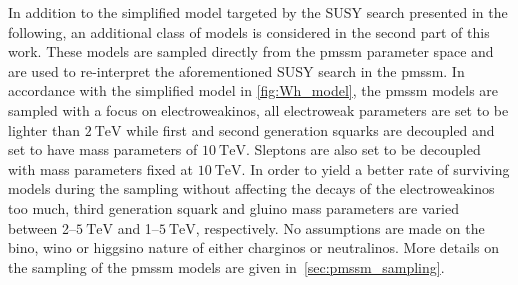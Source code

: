 In addition to the simplified model targeted by the SUSY search presented in the following, an additional class of models is considered in the second part of this work. These models are sampled directly from the \gls{pmssm} parameter space and are used to re-interpret the aforementioned SUSY search in the \gls{pmssm}. In accordance with the simplified model in \cref{fig:Wh_model}, the \gls{pmssm} models are sampled with a focus on electroweakinos, \ie all electroweak parameters are set to be lighter than $\SI{2}{\TeV}$ while first and second generation squarks are decoupled and set to have mass parameters of $\SI{10}{\TeV}$. Sleptons are also set to be decoupled with mass parameters fixed at $\SI{10}{\TeV}$.  In order to yield a better rate of surviving models during the sampling without affecting the decays of the electroweakinos too much, third generation squark and gluino mass parameters are varied between 2--$\SI{5}{\TeV}$ and 1--$\SI{5}{\TeV}$, respectively. No assumptions are made on the bino, wino or higgsino nature of either charginos or neutralinos. More details on the sampling of the \gls{pmssm} models are given in~\cref{sec:pmssm_sampling}. 





